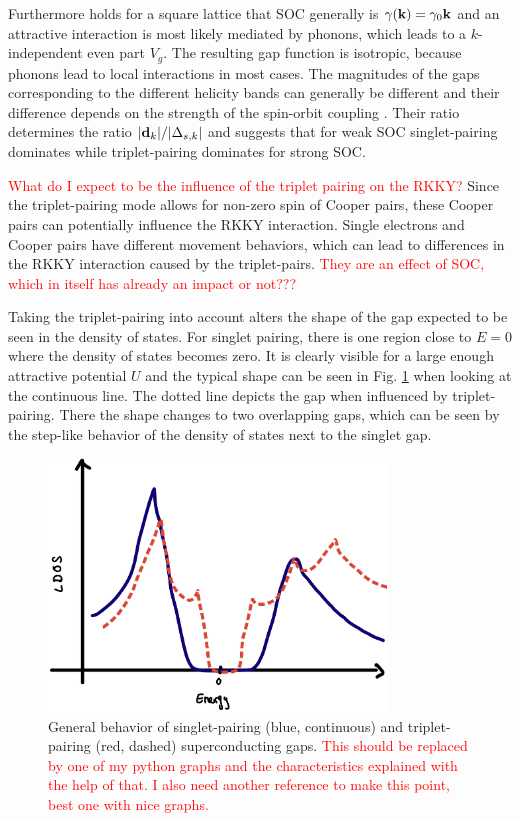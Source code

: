 Furthermore holds for a square lattice that SOC generally is $\vb{\gamma}(\vb{k}) = \gamma_0 \vb{k}$ and an attractive interaction is most likely mediated by phonons, which leads to a $k$-independent even part $V_g$.
The resulting gap function is isotropic, because phonons lead to local interactions in most cases.
The magnitudes of the gaps corresponding to the different helicity bands can generally be different and their difference depends on the strength of the spin-orbit coupling \cite{samokhin2008gap}.
Their ratio determines the ratio $|\vb{d}_k|/|\Delta_{s,k}|$ and suggests that for weak SOC singlet-pairing dominates while triplet-pairing dominates for strong SOC. \newline

\textcolor{red}{What do I expect to be the influence of the triplet pairing on the RKKY?} \newline
Since the triplet-pairing mode allows for non-zero spin of Cooper pairs, these Cooper pairs can potentially influence the RKKY interaction.
Single electrons and Cooper pairs have different movement behaviors, which can lead to differences in the RKKY interaction caused by the triplet-pairs.
\textcolor{red}{They are an effect of SOC, which in itself has already an impact or not???}

Taking the triplet-pairing into account alters the shape of the gap expected to be seen in the density of states.
For singlet pairing, there is one region close to $E=0$ where the density of states becomes zero.
It is clearly visible for a large enough attractive potential $U$ and the typical shape can be seen in Fig. \ref{fig:gap_shape_general} when looking at the continuous line.
The dotted line depicts the gap when influenced by triplet-pairing. 
There the shape changes to two overlapping gaps, which can be seen by the step-like behavior of the density of states next to the singlet gap.

\begin{figure}
    \centering
    \includegraphics[width=0.8\textwidth]{Images/FDB0FF39-C759-4473-8DBA-F65EB632BAAA.jpeg}
    \caption{General behavior of singlet-pairing (blue, continuous) and triplet-pairing (red, dashed) superconducting gaps. \textcolor{red}{This should be replaced by one of my python graphs and the characteristics explained with the help of that. I also need another reference to make this point, best one with nice graphs.}}
    \label{fig:gap_shape_general}
\end{figure}

